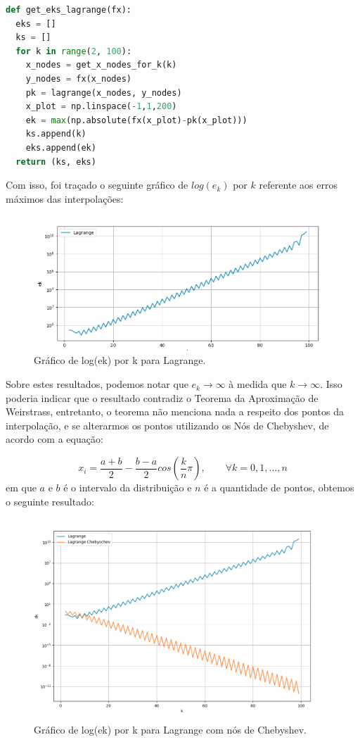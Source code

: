 \documentclass[12pt]{article}
\begin{document}
\begin{lstlisting}[language=Python]
def get_eks_lagrange(fx):
  eks = []
  ks = []
  for k in range(2, 100):
    x_nodes = get_x_nodes_for_k(k)
    y_nodes = fx(x_nodes)
    pk = lagrange(x_nodes, y_nodes)
    x_plot = np.linspace(-1,1,200)
    ek = max(np.absolute(fx(x_plot)-pk(x_plot)))
    ks.append(k)
    eks.append(ek)
  return (ks, eks)
\end{lstlisting}

Com isso, foi traçado o seguinte gráfico de $log(e_k)$ por $k$ referente aos erros máximos das interpolações:

\begin{figure}[H]
  \begin{center}
    \includegraphics[width=0.8\linewidth]{lagrange_eks_semilogy.png}
  \end{center}
  \caption{Gráfico de log(ek) por k para Lagrange.}
  \label{fig:leastsquares1}
\end{figure}

Sobre estes resultados, podemos notar que $e_k \rightarrow \infty $ à medida que $k \rightarrow \infty $. Isso poderia indicar que o resultado contradiz o Teorema da Aproximação de Weirstrass, entretanto, o teorema não menciona nada a respeito dos pontos da interpolação, e se alterarmos os pontos utilizando os Nós de Chebyshev, de acordo com a equação:

$$
  x_i = \frac{a+b}{2} - \frac{b-a}{2} cos(\frac{k}{n} \pi),  \qquad \forall k = 0, 1, ... , n
$$
em que $a$ e $b$ é o intervalo da distribuição e $n$ é a quantidade de pontos, obtemos o seguinte resultado:

\begin{figure}[H]
  \begin{center}
    \includegraphics[width=0.8\linewidth]{lagrange_chebyshev.png}
  \end{center}
  \caption{Gráfico de log(ek) por k para Lagrange com nós de Chebyshev.}
  \label{fig:leastsquares1}
\end{figure}
\end{document}
